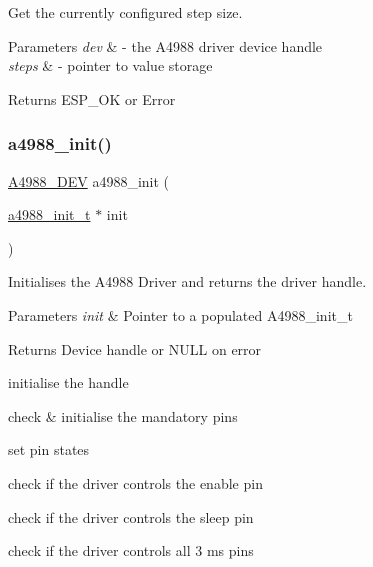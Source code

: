 Get the currently configured step size. 


\begin{DoxyParams}{Parameters}
{\em dev} & -\/ the A4988 driver device handle \\
\hline
{\em steps} & -\/ pointer to value storage \\
\hline
\end{DoxyParams}
\begin{DoxyReturn}{Returns}
E\+S\+P\+\_\+\+OK or Error 
\end{DoxyReturn}
\mbox{\label{group__A4988__Driver__functions_ga169b52420965fa29fa24319c932234e0}} 
\subsubsection{\texorpdfstring{a4988\+\_\+init()}{a4988\_init()}}
{\footnotesize\ttfamily \hyperlink{group__A4988__definitions_ga16590a9dd79ad8fcf4c317be2659b6c5}{A4988\+\_\+\+D\+EV} a4988\+\_\+init (\begin{DoxyParamCaption}\item[{\hyperlink{group__A4988__definitions_gac5bf19333196aea92a3ab2fa176b7f65}{a4988\+\_\+init\+\_\+t} $\ast$}]{init }\end{DoxyParamCaption})}



Initialises the A4988 Driver and returns the driver handle. 


\begin{DoxyParams}{Parameters}
{\em init} & Pointer to a populated A4988\+\_\+init\+\_\+t \\
\hline
\end{DoxyParams}
\begin{DoxyReturn}{Returns}
Device handle or N\+U\+LL on error 
\end{DoxyReturn}
initialise the handle

check \& initialise the mandatory pins

set pin states

check if the driver controls the enable pin

check if the driver controls the sleep pin

check if the driver controls all 3 ms pins

